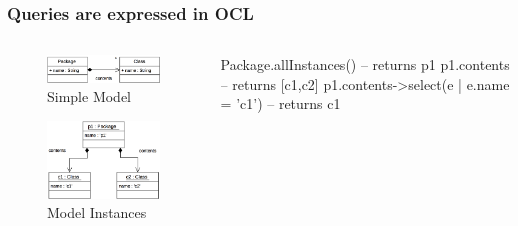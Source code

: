 \documentclass[10pt]{beamer}
\begin{document}
\begin{frame}[fragile]\frametitle{Queries are expressed in OCL}
	
	\begin{columns}
		\begin{column}{0.5\textwidth}
	\begin{figure}[htbp]
		\centering
			\includegraphics[width=\textwidth]{mogwai-model.png}
		\caption{Simple Model}
		\label{fig:label}
	\end{figure}
	\begin{figure}[htbp]
		\centering
			\includegraphics[width=\textwidth]{mogwai-instances.png}
		\caption{Model Instances}
		\label{fig:label}
	\end{figure}		
		\end{column}
		\begin{column}{0.5\textwidth}
		\begin{ocl}
Package.allInstances()  -- returns p1
p1.contents				-- returns [c1,c2]
p1.contents->select(e | e.name = 'c1') 
		-- returns c1
		\end{ocl}
		\end{column}
	\end{columns}
\end{frame}
\end{document}
